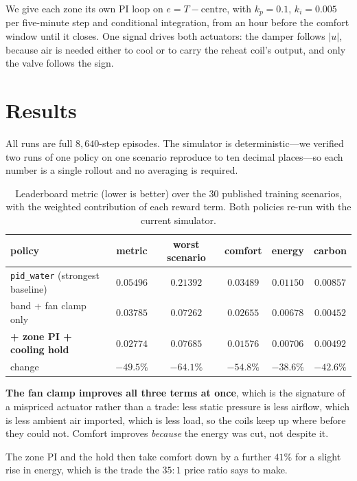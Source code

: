\documentclass[10pt]{article}
\begin{document}
We give each zone its own PI loop on $e = T - \text{centre}$, with
$k_p=0.1$, $k_i=0.005$ per five-minute step and conditional integration, from
an hour before the comfort window until it closes. One signal drives both
actuators: the damper follows $|u|$, because air is needed either to cool or to
carry the reheat coil's output, and only the valve follows the sign.

\section{Results}

All runs are full $8{,}640$-step episodes. The simulator is deterministic---we
verified two runs of one policy on one scenario reproduce to ten decimal
places---so each number is a single rollout and no averaging is required.

\begin{table}[h]
\centering
\caption{Leaderboard metric (lower is better) over the 30 published training
scenarios, with the weighted contribution of each reward term. Both policies
re-run with the current simulator.}
\begin{tabular}{lccccc}
\toprule
policy & metric & worst scenario & comfort & energy & carbon \\
\midrule
\texttt{pid\_water} (strongest baseline) & $0.05496$ & $0.21392$ & $0.03489$ & $0.01150$ & $0.00857$ \\
band + fan clamp only & $0.03785$ & $0.07262$ & $0.02655$ & $0.00678$ & $0.00452$ \\
\textbf{+ zone PI + cooling hold} & $\mathbf{0.02774}$ & $\mathbf{0.07685}$ & $0.01576$ & $0.00706$ & $0.00492$ \\
\midrule
change & $-49.5\%$ & $-64.1\%$ & $-54.8\%$ & $-38.6\%$ & $-42.6\%$ \\
\bottomrule
\end{tabular}
\label{tab:main}
\end{table}

\textbf{The fan clamp improves all three terms at once}, which is the
signature of a mispriced actuator rather than a trade: less static pressure is
less airflow, which is less ambient air imported, which is less load, so the
coils keep up where before they could not. Comfort improves \emph{because} the
energy was cut, not despite it.

The zone PI and the hold then take comfort down by a further $41\%$ for a
slight rise in energy, which is the trade the $35{:}1$ price ratio says to
make.
\end{document}
